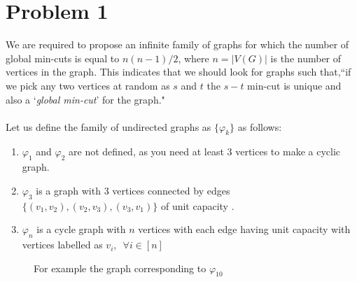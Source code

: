 \documentclass{article}
\numberwithin{equation}{section}
\begin{document}
\section{Problem 1} %
We are required to propose an infinite family of graphs for which the number of global min-cuts is equal to $n(n-1)/2$, where $n = |V(G)|$ is the number of vertices in the graph. This indicates that we should look for graphs such that,``if we pick any two vertices at random as $s$ and $t$ the $s-t$ min-cut is unique and also a `\textit{global min-cut}' for the graph."\\\\
Let us define the family of undirected graphs as $\{\varphi_k\}$ as follows: 
\begin{enumerate}
    \item $\varphi_1$ and $\varphi_2$ are not defined, as you need at least 3 vertices to make a cyclic graph. 
    \item $\varphi_3$ is a graph with 3 vertices connected by edges $\{(v_1, v_2), (v_2, v_3), (v_3, v_1)\}$ of unit capacity . 
    \item $\varphi_n$ is a cycle graph with $n$ vertices with each edge having unit capacity with vertices labelled as $v_i, \, \, \, \forall i \in [n]$ 
\end{enumerate}
\begin{figure}[H]
    \centering


    \caption{For example the graph corresponding to $\varphi_{10}$}
    \label{fig:enter-label}
\end{figure}
\end{document}
